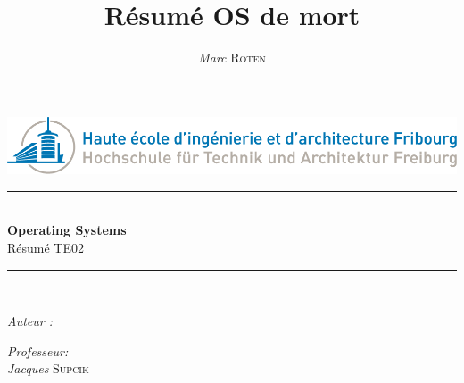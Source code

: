
 
\title{Résumé OS de mort} 
\author{\textsl{Marc} \textsc{Roten}}
\date{}

 
 

    \begin{titlepage}
        \begin{center}
            \includegraphics[scale=.4]{Img/heia-fr-logo.png}\\[1.3cm]
            
            \rule{\linewidth}{0.3mm} \\[0.3cm]
            {\huge \bfseries Operating Systems\\[0.5cm]} 
            {\Large  Résumé TE02 }
            \rule{\linewidth}{0.3mm} \\[0.8cm]
            \noindent{}
            \begin{minipage}[t]{0.4\textwidth} 
                \begin{flushleft} \large
                    \emph{Auteur :}\\
                    \theauthor
                \end{flushleft}
            \end{minipage}
            \begin{minipage}[t]{0.4\textwidth} 
                \begin{flushright} \large
                    \emph{Professeur:}\\
                    \textsl{Jacques} \textsc{ Supcik}\\ 
                \end{flushright} 
                \vfill
            \end{minipage}\\[1.3cm]

\end{center}
\end{titlepage}
